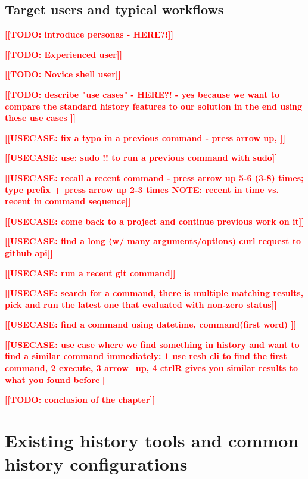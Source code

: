 \documentclass[thesis=M,english]{FITthesis}[2012/10/20]
\newcommand{\todotext}[1]{\textcolor{red}{\textbf{[[#1]]}}}
\newcommand{\blind}[1][1]{\textcolor{mygray}{\Blindtext[#1][1]}}
\begin{document}
\subsection{Target users and typical workflows}

\todotext{TODO: introduce personas - HERE?!}

\todotext{TODO: Experienced user}

\todotext{TODO: Novice shell user}



\todotext{TODO: describe "use cases" - HERE?! - yes because we want to compare the standard history features to our solution in the end using these use cases }

\todotext{USECASE: fix a typo in a previous command - press arrow up, }

\todotext{USECASE: use: sudo !! to run a previous command with sudo}

\todotext{USECASE: recall a recent command - press arrow up 5-6 (3-8) times; type prefix + press arrow up 2-3 times NOTE: recent in time vs. recent in command sequence}

\todotext{USECASE: come back to a project and continue previous work on it}

\todotext{USECASE: find a long (w/ many arguments/options) curl request to github api}

\todotext{USECASE: run a recent git command}

\todotext{USECASE: search for a command, there is multiple matching results, pick and run the latest one that evaluated with non-zero status}

\todotext{USECASE: find a command using datetime, command(first word) }

\todotext{USECASE: use case where we find something in history and want to find a similar command immediately: 1 use resh cli to find the first command, 2 execute, 3 arrow\_up, 4 ctrlR gives you similar results to what you found before}


\blind[4]

\todotext{TODO: conclusion of the chapter}

\blind

\section{Existing history tools and common history configurations}
\end{document}
